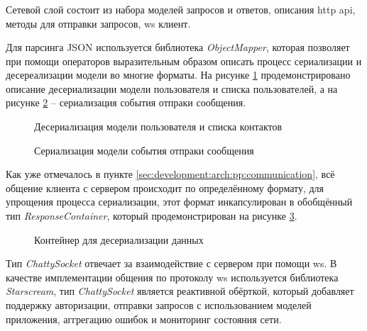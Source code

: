 \subsubsection{}
\label{sec:development:client:networking}

Сетевой слой состоит из набора моделей запросов и ответов, описания \gls{http} \gls{api}, методы для отправки запросов, \gls{ws} клиент.

Для парсинга JSON используется библиотека \textit{ObjectMapper}, которая позволяет при помощи операторов выразительным образом описать процесс сериализации и десереализации модели во многие форматы.
На рисунке \ref{sec:development:client:networking:code:deserialize} продемонстрировано описание десериализации модели пользователя и списка пользователей, а на рисунке \ref{sec:development:client:networking:code:serialize} -- сериализация события отпраки сообщения.

\begin{figure}[h]
	
   \caption{Десериализация модели пользователя и списка контактов}
   \label{sec:development:client:networking:code:deserialize}
\end{figure}

\begin{figure}[h]
	
   \caption{Сериализация модели события отпраки сообщения}
   \label{sec:development:client:networking:code:serialize}
\end{figure}

Как уже отмечалось в пункте \ref{sec:development:arch:pp:communication}, всё общение клиента с сервером происходит по определённому формату, для упрощения процесса сериализации, этот формат инкапсулирован в обобщённый тип \textit{ResponseContainer}, который продемонстрирован на рисунке \ref{sec:development:client:networking:code:deserialize:container}.

\begin{figure}[h]
	
   \caption{Контейнер для десериализации данных}
   \label{sec:development:client:networking:code:deserialize:container}
\end{figure}

Тип \textit{ChattySocket} отвечает за взаимодействие с сервером при помощи \gls{ws}. В качестве имплементации общения по протоколу \gls{ws} используется библиотека \textit{Starscream}, тип \textit{ChattySocket} является реактивной обёрткой, который добавляет поддержку авторизации, отправки запросов с использованием моделей приложения, аггрегацию ошибок и мониторинг состояния сети.

